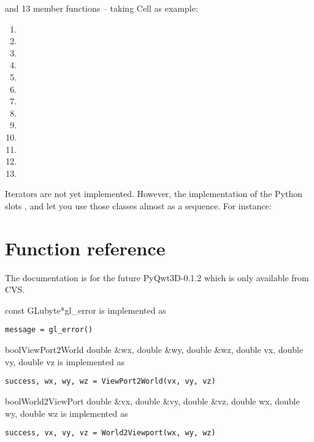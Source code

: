 \documentclass{manual}
\newcommand{\Future}{
  \begin{notice}[warning]
    The documentation is for the future PyQwt3D-0.1.2 which is only available
    from CVS.
  \end{notice}
}
\begin{document}
and 13 member functions -- taking Cell as example:
\begin{enumerate}
\item
\item
\item
\item
\item
\item
\item
\item
\item
\item
\item
\item
\item
\end{enumerate}

Iterators are not yet implemented. However, the implementation of the
Python slots ,  and
 let you use those classes almost as a sequence.
For instance:



\section{Function reference \label{functions}}

\Future{}

\begin{cfuncdesc}{const GLubyte*}{gl_error}{}
  is implemented as
  \begin{verbatim}
message = gl_error()
  \end{verbatim}
\end{cfuncdesc}

\begin{cfuncdesc}{bool}{ViewPort2World}
  {double \&wx, double \&wy, double \&wz, double vx, double vy, double vz}
  is implemented as
  \begin{verbatim}
success, wx, wy, wz = ViewPort2World(vx, vy, vz)
  \end{verbatim}
\end{cfuncdesc}

\begin{cfuncdesc}{bool}{World2ViewPort}
  {double \&vx, double \&vy, double \&vz, double wx, double wy, double wz}
  is implemented as
  \begin{verbatim}
success, vx, vy, vz = World2Viewport(wx, wy, wz)
  \end{verbatim}
\end{cfuncdesc}



\end{document}
